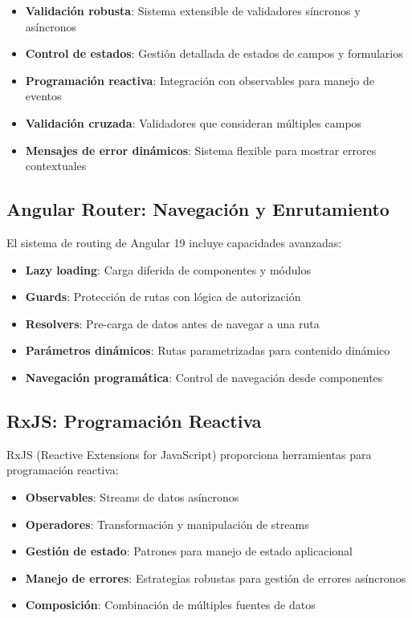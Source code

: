 \begin{itemize}
    \item \textbf{Validación robusta}: Sistema extensible de validadores síncronos y asíncronos
    \item \textbf{Control de estados}: Gestión detallada de estados de campos y formularios
    \item \textbf{Programación reactiva}: Integración con observables para manejo de eventos
    \item \textbf{Validación cruzada}: Validadores que consideran múltiples campos
    \item \textbf{Mensajes de error dinámicos}: Sistema flexible para mostrar errores contextuales
\end{itemize}

\subsection{Angular Router: Navegación y Enrutamiento}

El sistema de routing de Angular 19 incluye capacidades avanzadas:

\begin{itemize}
    \item \textbf{Lazy loading}: Carga diferida de componentes y módulos
    \item \textbf{Guards}: Protección de rutas con lógica de autorización
    \item \textbf{Resolvers}: Pre-carga de datos antes de navegar a una ruta
    \item \textbf{Parámetros dinámicos}: Rutas parametrizadas para contenido dinámico
    \item \textbf{Navegación programática}: Control de navegación desde componentes
\end{itemize}

\subsection{RxJS: Programación Reactiva}

RxJS (Reactive Extensions for JavaScript) proporciona herramientas para programación reactiva:

\begin{itemize}
    \item \textbf{Observables}: Streams de datos asíncronos
    \item \textbf{Operadores}: Transformación y manipulación de streams
    \item \textbf{Gestión de estado}: Patrones para manejo de estado aplicacional
    \item \textbf{Manejo de errores}: Estrategias robustas para gestión de errores asíncronos
    \item \textbf{Composición}: Combinación de múltiples fuentes de datos
\end{itemize}

